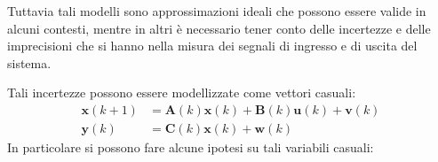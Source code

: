 \documentclass[12pt,a4paper]{article}
\newcommand*{\matr}{\mathbf}
\newcommand*{\vett}{\mathbf}
\begin{document}
Tuttavia tali modelli sono approssimazioni ideali che possono essere valide in alcuni contesti, mentre in altri è necessario tener conto delle incertezze e delle imprecisioni che si hanno nella misura dei segnali di ingresso e di uscita del sistema.

Tali incertezze possono essere modellizzate come vettori casuali:
\begin{align*}
\vett{x}(k+1) &= \matr{A}(k)\vett{x}(k) + \matr{B}(k)\vett{u}(k) + \vett{v}(k) \\
\vett{y}(k) &= \matr{C}(k)\vett{x}(k) + \vett{w}(k)
\end{align*}
In particolare si possono fare alcune ipotesi su tali variabili casuali:
\end{document}
